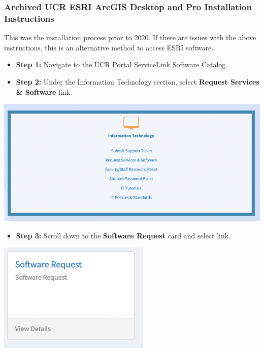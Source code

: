 \documentclass[
]{book}
\providecommand{\tightlist}{%
  \setlength{\itemsep}{0pt}\setlength{\parskip}{0pt}}
\begin{document}
\hypertarget{archived-ucr-esri-arcgis-desktop-and-pro-installation-instructions}{%
\subsubsection{Archived UCR ESRI ArcGIS Desktop and Pro Installation Instructions}\label{archived-ucr-esri-arcgis-desktop-and-pro-installation-instructions}}

This was the installation process prior to 2020. If there are issues with the above instructions, this is an alternative method to access ESRI software.

\begin{itemize}
\item
  \textbf{Step 1:} Navigate to the \href{https://ucrsupport.service-now.com/ucr_portal}{UCR Portal ServiceLink Software Catalog}.
\item
  \textbf{Step 2:} Under the Information Technology section, select \textbf{Request Services \& Software} link.
\end{itemize}

\begin{center}\includegraphics[width=0.75\linewidth]{images/ServiceLink} \end{center}

\begin{itemize}
\tightlist
\item
  \textbf{Step 3:} Scroll down to the \textbf{Software Request} card and select link.
\end{itemize}

\begin{center}\includegraphics[width=0.45\linewidth]{images/softwarerequest} \end{center}
\end{document}
